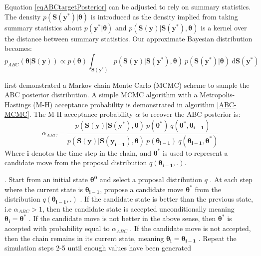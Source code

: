 Equation \ref{eqABCtargetPosterior} can be adjusted to rely on summary statistics. The density $p(\bm{S}(\bm{y^*})|\bm{\theta})$ is introduced as the density implied from taking summary statistics about $p(\bm{y^*}|\bm{\theta})$ and $p(\bm{S}(\bm{y})|\bm{S}(\bm{y^*}),\bm{\theta})$ is a kernel over the distance between summary statistics. Our approximate Bayesian distribution becomes:
\begin{equation}
p_{ABC}(\bm{\theta}|\bm{S}(\bm{y})) \propto p(\bm{\theta}) \int_{\bm{S}(\bm{y^*})} p(\bm{S}(\bm{y})|\bm{S}(\bm{y^*}),\bm{\theta})\  p(\bm{S}(\bm{y^*})|\bm{\theta})\ \text{d}\bm{S}(\bm{y^*})
\end{equation}

\citet{Marjoram2003} first demonstrated a Markov chain Monte Carlo (MCMC) scheme to sample the ABC posterior distribution. A simple MCMC algorithm with a Metropolis-Hastings (M-H) acceptance probability is demonstrated in algorithm \ref{ABC-MCMC}. The M-H acceptance probability $\alpha$ to recover the ABC posterior is:
\begin{equation}
\alpha_{ABC} = \frac{p(\bm{S}(\bm{y})|\bm{S}(\bm{y^*}),\bm{\theta})\ p(\bm{\theta^*})\ q(\bm{\theta^*},\bm{\theta_{i-1}})} {p(\bm{S}(\bm{y})|\bm{S}(\bm{y_{i-1}}),\bm{\theta})\ p(\bm{\theta_{i-1}})\ q(\bm{\theta_{i-1}},\bm{\theta^*})}
\end{equation}
Where $\bm{i}$ denotes the time step in the chain, and $\bm{\theta^*}$ is used to represent a candidate move from the proposal distribution $q(\bm{\theta_{i-1}}, . )$.

\begin{algorithm}[H]
	\caption{ }
	\begin{algorithmic}
		. Start from an initial state $\bm{\theta^0}$ and select a proposal distribution $q$
		. At each step where the current state is $\bm{\theta_{i-1}}$, propose a candidate 	move $\bm{\theta^*}$ from the distribution $q(\bm{\theta_{i-1}},.)$		
		. If the candidate state is better than the previous state, i.e $\alpha_{ABC} > 1$, then the candidate state is accepted unconditionally meaning $\bm{\theta_i} = \bm{\theta^*}$
		. If the candidate move is not better in the above sense, then $\bm{\theta^*}$ is accepted with probability equal to $\alpha_{ABC}$		
		. If the candidate move is not accepted, then the chain remains in its current state, meaning $\bm{\theta_{i}} = \bm{\theta_{i-1}}$		
		. Repeat the simulation steps 2-5 until enough values have been generated
	\end{algorithmic}
	\label{ABC-MCMC}
\end{algorithm}


